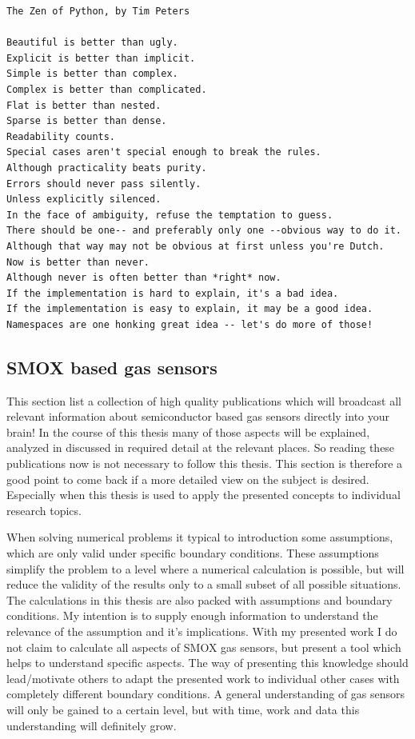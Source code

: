 \documentclass[11pt]{article}
\begin{document}
    \begin{Verbatim}[commandchars=\\\{\}]
The Zen of Python, by Tim Peters

Beautiful is better than ugly.
Explicit is better than implicit.
Simple is better than complex.
Complex is better than complicated.
Flat is better than nested.
Sparse is better than dense.
Readability counts.
Special cases aren't special enough to break the rules.
Although practicality beats purity.
Errors should never pass silently.
Unless explicitly silenced.
In the face of ambiguity, refuse the temptation to guess.
There should be one-- and preferably only one --obvious way to do it.
Although that way may not be obvious at first unless you're Dutch.
Now is better than never.
Although never is often better than *right* now.
If the implementation is hard to explain, it's a bad idea.
If the implementation is easy to explain, it may be a good idea.
Namespaces are one honking great idea -- let's do more of those!
    \end{Verbatim}

    \hypertarget{smox-based-gas-sensors}{%
\subsection{SMOX based gas sensors}\label{smox-based-gas-sensors}}

This section list a collection of high quality publications which will
broadcast all relevant information about semiconductor based gas sensors
directly into your brain! In the course of this thesis many of those
aspects will be explained, analyzed in discussed in required detail at
the relevant places. So reading these publications now is not necessary
to follow this thesis. This section is therefore a good point to come
back if a more detailed view on the subject is desired. Especially when
this thesis is used to apply the presented concepts to individual
research topics.

When solving numerical problems it typical to introduction some
assumptions, which are only valid under specific boundary conditions.
These assumptions simplify the problem to a level where a numerical
calculation is possible, but will reduce the validity of the results
only to a small subset of all possible situations. The calculations in
this thesis are also packed with assumptions and boundary conditions. My
intention is to supply enough information to understand the relevance of
the assumption and it's implications. With my presented work I do not
claim to calculate all aspects of SMOX gas sensors, but present a tool
which helps to understand specific aspects. The way of presenting this
knowledge should lead/motivate others to adapt the presented work to
individual other cases with completely different boundary conditions. A
general understanding of gas sensors will only be gained to a certain
level, but with time, work and data this understanding will definitely
grow.
\end{document}
